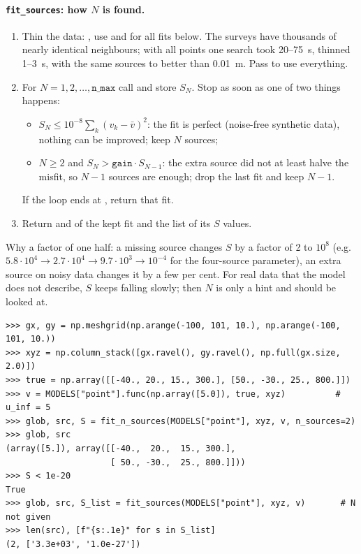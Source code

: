 \documentclass{article}
\begin{document}
\paragraph{\texttt{fit\_sources}: how $N$ is found.}
\begin{enumerate}
\item Thin the data: , use
       and  for all fits below. The surveys have
      thousands of nearly identical neighbours; with all points one search
      took 20--75~s, thinned 1--3~s, with the same sources to better than 0.01~m.
      Pass  to use everything.
\item For $N=1,2,\dots,\texttt{n\_max}$ call  and store $S_N$.
      Stop as soon as one of two things happens:
      \begin{itemize}
      \item $S_N\le10^{-8}\sum_k(v_k-\bar v)^2$: the fit is perfect (noise-free
            synthetic data), nothing can be improved; keep $N$ sources;
      \item $N\ge2$ and $S_N>\texttt{gain}\cdot S_{N-1}$: the extra source did not
            at least halve the misfit, so $N-1$ sources are enough; drop the last
            fit and keep $N-1$.
      \end{itemize}
      If the loop ends at , return that fit.
\item Return  and  of the kept fit and the list of its $S$ values.
\end{enumerate}
Why a factor of one half: a missing source changes $S$ by a factor of 2 to $10^8$
(e.g.\ $5.8\cdot10^4\to2.7\cdot10^4\to9.7\cdot10^3\to10^{-4}$ for the four-source
parameter), an extra source on noisy data changes it by a few per cent. For real
data that the model does not describe, $S$ keeps falling slowly; then $N$ is only a
hint and  should be looked at.

\begin{lstlisting}
>>> gx, gy = np.meshgrid(np.arange(-100, 101, 10.), np.arange(-100, 101, 10.))
>>> xyz = np.column_stack([gx.ravel(), gy.ravel(), np.full(gx.size, 2.0)])
>>> true = np.array([[-40., 20., 15., 300.], [50., -30., 25., 800.]])
>>> v = MODELS["point"].func(np.array([5.0]), true, xyz)          # u_inf = 5
>>> glob, src, S = fit_n_sources(MODELS["point"], xyz, v, n_sources=2)
>>> glob, src
(array([5.]), array([[-40.,  20.,  15., 300.],
                     [ 50., -30.,  25., 800.]]))
>>> S < 1e-20
True
>>> glob, src, S_list = fit_sources(MODELS["point"], xyz, v)       # N not given
>>> len(src), [f"{s:.1e}" for s in S_list]
(2, ['3.3e+03', '1.0e-27'])
\end{lstlisting}
\end{document}

